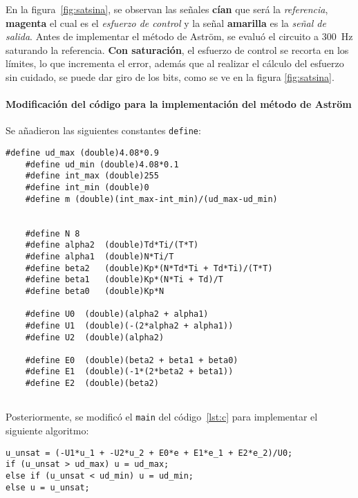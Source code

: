 

En la figura~\ref{fig:satsina}, se observan las señales \textbf{cían} que será la \textit{referencia}, \textbf{magenta} el cual es el \textit{esfuerzo de control} y la señal \textbf{amarilla} es la \textit{señal de salida}. \hfill \break
Antes de implementar el método de Aström, se evaluó el circuito a \SI{300}{\hertz} saturando la referencia. 
\textbf{Con saturación}, el esfuerzo de control se recorta en los límites, lo que incrementa el error, además que al realizar el cálculo del esfuerzo sin cuidado, se puede dar giro de los bits, como se ve en la figura \ref{fig:satsina}. 


\onecolumn
\paragraph{Modificación del código para la implementación del método de Astr\"om}
Se añadieron las siguientes constantes \texttt{define}: \hfill \break

\begin{lstlisting}[style=cstyle,caption={Definiciones adicionales para implementar Astr\"om},label={lst:c1}]
	#define ud_max (double)4.08*0.9
	#define ud_min (double)4.08*0.1
	#define int_max (double)255
	#define int_min (double)0
	#define m (double)(int_max-int_min)/(ud_max-ud_min)
	
	
	#define N 8
	#define alpha2  (double)Td*Ti/(T*T)
	#define alpha1  (double)N*Ti/T
	#define beta2   (double)Kp*(N*Td*Ti + Td*Ti)/(T*T)
	#define beta1   (double)Kp*(N*Ti + Td)/T
	#define beta0   (double)Kp*N
	
	#define U0  (double)(alpha2 + alpha1)
	#define U1  (double)(-(2*alpha2 + alpha1))
	#define U2  (double)(alpha2)
	
	#define E0  (double)(beta2 + beta1 + beta0)
	#define E1  (double)(-1*(2*beta2 + beta1))
	#define E2  (double)(beta2)
	
\end{lstlisting}

Posteriormente, se modificó el \texttt{main} del código~\ref{lst:c} para implementar el siguiente algoritmo:

\begin{lstlisting}[style=cstyle,caption={Implementación del algoritmo de Aström con saturación},label={lst:c1}]
u_unsat = (-U1*u_1 + -U2*u_2 + E0*e + E1*e_1 + E2*e_2)/U0;
if (u_unsat > ud_max) u = ud_max;
else if (u_unsat < ud_min) u = ud_min;
else u = u_unsat;

\end{lstlisting}

